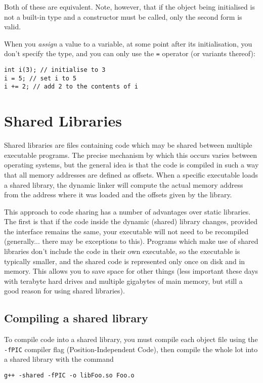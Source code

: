 \documentclass[a4paper]{scrartcl}
\begin{document}
Both of these are equivalent. Note, however, that if the object being initialised is not a built-in type and a constructor must be called, only the second form is valid.

When you \emph{assign} a value to a variable, at some point after its initialisation, you don't specify the type, and you can only use the \verb|=| operator (or variants thereof):
\begin{verbatim}
int i(3); // initialise to 3
i = 5; // set i to 5
i += 2; // add 2 to the contents of i
\end{verbatim}

\section{Shared Libraries}
Shared libraries are files containing code which may be shared between multiple executable programs. The precise mechanism by which this occurs varies between operating systems, but the general idea is that the code is compiled in such a way that all memory addresses are defined as offsets. When a specific executable loads a shared library, the dynamic linker will compute the actual memory address from the address where it was loaded and the offsets given by the library.

This approach to code sharing has a number of advantages over static libraries. The first is that if the code inside the dynamic (shared) library changes, provided the interface remains the same, your executable will not need to be recompiled (generally... there may be exceptions to this). Programs which make use of shared libraries don't include the code in their own executable, so the executable is typically smaller, and the shared code is represented only once on disk and in memory. This allows you to save space for other things (less important these days with terabyte hard drives and multiple gigabytes of main memory, but still a good reason for using shared libraries).

\subsection{Compiling a shared library}
To compile code into a shared library, you must compile each object file using the \verb|-fPIC| compiler flag (Position-Independent Code), then compile the whole lot into a shared library with the command
\begin{verbatim}
g++ -shared -fPIC -o libFoo.so Foo.o
\end{verbatim}
\end{document}
